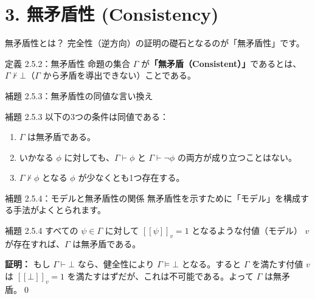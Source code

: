\documentclass[unicode,10pt]{beamer}
\begin{document}
\section{3. 無矛盾性 (Consistency)}

\begin{frame}{無矛盾性とは？}
    完全性（逆方向）の証明の礎石となるのが「無矛盾性」です。

    \begin{block}{定義 2.5.2：無矛盾性}
        命題の集合 $\Gamma$ が\textbf{「無矛盾（Consistent）」}であるとは、$\Gamma \not\vdash \bot$（$\Gamma$ から矛盾を導出できない）ことである。
    \end{block}
    
\end{frame}

\begin{frame}{補題 2.5.3：無矛盾性の同値な言い換え}
    \begin{block}{補題 2.5.3}
        以下の3つの条件は同値である：
        \begin{enumerate}
            \item[(i)] $\Gamma$ は無矛盾である。
            \item[(ii)] いかなる $\phi$ に対しても、$\Gamma \vdash \phi$ と $\Gamma \vdash \neg \phi$ の両方が成り立つことはない。
            \item[(iii)] $\Gamma \not\vdash \phi$ となる $\phi$ が少なくとも1つ存在する。
        \end{enumerate}
    \end{block}

\end{frame}

\begin{frame}{補題 2.5.4：モデルと無矛盾性の関係}
    無矛盾性を示すために「モデル」を構成する手法がよくとられます。

    \begin{block}{補題 2.5.4}
        すべての $\psi \in \Gamma$ に対して $[[\psi]]_v = 1$ となるような付値（モデル） $v$ が存在すれば、$\Gamma$ は無矛盾である。
    \end{block}
    
    \textbf{証明：}
    もし $\Gamma \vdash \bot$ なら、健全性により $\Gamma \models \bot$ となる。すると $\Gamma$ を満たす付値 $v$ は $[[\bot]]_v = 1$ を満たすはずだが、これは不可能である。よって $\Gamma$ は無矛盾。\qed
\end{frame}
\end{document}
